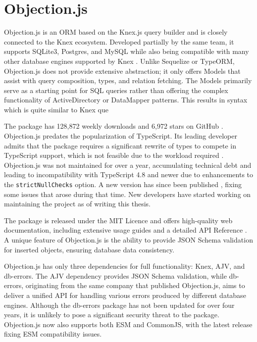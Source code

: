 \section{Objection.js}
Objection.js is an ORM based on the Knex.js query builder and is closely
connected to the Knex ecosystem. Developed partially by the same team, it
supports SQLite3, Postgres, and MySQL while also being compatible with many
other database engines supported by Knex \cite{objectionGitHub}. Unlike
Sequelize or TypeORM, Objection.js does not provide extensive abstraction; it
only offers Models that assist with query composition, types, and relation
fetching. The Models primarily serve as a starting point for SQL queries rather
than offering the complex functionality of ActiveDirectory or DataMapper
patterns. This results in syntax which is quite similar to Knex que 

The package has 128,872 weekly downloads \cite{objectionNpm} and 6,972 stars on
GitHub \cite{objectionGitHub}. Objection.js predates the popularization of
TypeScript. Its leading developer admits that the package requires a significant
rewrite of types to compete in TypeScript support, which is not feasible due to
the workload required \cite{objectionFuture}. Objection.js was not maintained
for over a year, accumulating technical debt and leading to incompatibility with
TypeScript 4.8 and newer due to enhancements to the \texttt{strictNullChecks}
option. A new version has since been published \cite{objection302}, fixing some
issues that arose during that time. New developers have started working on
maintaining the project as of writing this thesis.

The package is released under the MIT Licence and offers high-quality web
documentation, including extensive usage guides and a detailed API Reference
\cite{objectionDocs}. A unique feature of Objection.js is the ability to provide
JSON Schema validation for inserted objects, ensuring database data consistency.

Objection.js has only three dependencies for full functionality: Knex, AJV, and
db-errors. The AJV dependency provides JSON Schema validation, while db-errors,
originating from the same company that published Objection.js, aims to deliver a
unified API for handling various errors produced by different database engines.
Although the db-errors package has not been updated for over four years, it is
unlikely to pose a significant security threat to the package. Objection.js now
also supports both ESM and CommonJS, with the latest release fixing ESM
compatibility issues.


